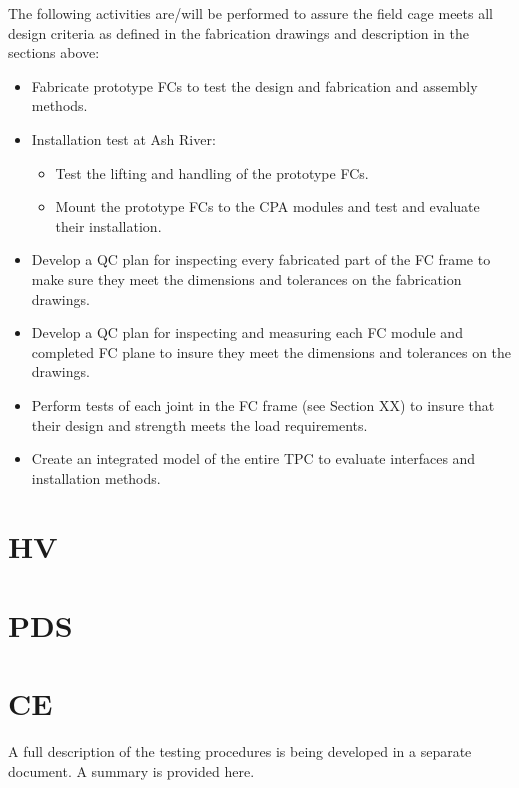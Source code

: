 The following activities are/will be performed to assure the field cage meets all design criteria as defined in the fabrication drawings and description in the sections above:
\begin{itemize}
\item	Fabricate prototype FCs to test the design and fabrication and assembly methods.
\item	Installation test at Ash River:
\begin{itemize}
\item	Test the lifting and handling of the prototype FCs.
\item	Mount the prototype FCs to the CPA modules and test and evaluate their installation.
\end{itemize}
\item	Develop a QC plan for inspecting every fabricated part of the FC frame to make sure they meet the dimensions and tolerances on the fabrication drawings.
\item	Develop a QC plan for inspecting and measuring each FC module and completed FC plane to insure they meet the dimensions and tolerances on the drawings.
\item	Perform tests of each joint in the FC frame (see Section XX) to insure that their design and strength meets the load requirements.
\item	Create an integrated model of the entire TPC to evaluate interfaces and installation methods.  
\end{itemize}

\section{HV}


\section{PDS}


\section{CE}

A full description of the testing procedures is being developed in a separate document. A 
summary is provided here.

